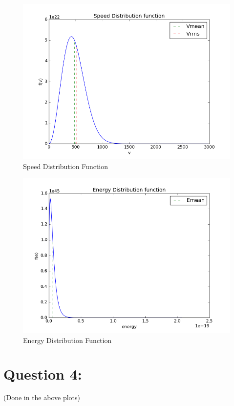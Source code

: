\documentclass[11pt, a4paper]{article}
\begin{document}
\begin{figure}[H]
 \centering
 \includegraphics[scale = 0.5]{f_speed.png}
 \caption{Speed Distribution Function}
 \label{fig:speed_pdf}
\end{figure}

\begin{figure}[H]
 \centering
 \includegraphics[scale = 0.5]{f_energy.png}
 \caption{Energy Distribution Function}
 \label{fig:energy_pdf}
\end{figure}

\section{Question 4:}
(Done in the above plots)
\end{document}
